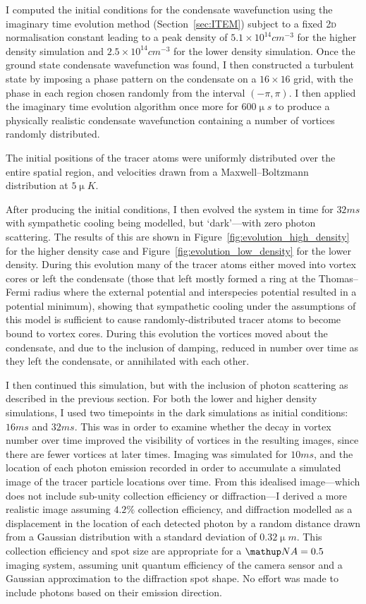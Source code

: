 I computed the initial conditions for the condensate wavefunction using the imaginary time evolution method (Section~\ref{sec:ITEM}) subject to a fixed \textsc{2d} normalisation constant leading to a peak density of $5.1\times 10^{14}\unit{cm}^{-3}$ for the higher density simulation and $2.5\times 10^{14}\unit{cm}^{-3}$ for the lower density simulation. Once the ground state condensate wavefunction was found, I then constructed a turbulent state by imposing a phase pattern on the condensate on a $16\times16$ grid, with the phase in each region chosen randomly from the interval $(-\pi, \pi)$. I then applied the imaginary time evolution algorithm once more for $600\unit{\upmu s}$ to produce a physically realistic condensate wavefunction containing a number of vortices randomly distributed.

The initial positions of the tracer atoms were uniformly distributed over the entire spatial region, and velocities drawn from a Maxwell--Boltzmann distribution at $5\unit{\upmu K}$.

After producing the initial conditions, I then evolved the system in time for $32\unit{ms}$ with sympathetic cooling being modelled, but `dark'---with zero photon scattering. The results of this are shown in Figure~\ref{fig:evolution_high_density} for the higher density case and Figure~\ref{fig:evolution_low_density} for the lower density. During this evolution many of the tracer atoms either moved into vortex cores or left the condensate (those that left mostly formed a ring at the Thomas--Fermi radius where the external potential and interspecies potential resulted in a potential minimum), showing that sympathetic cooling under the assumptions of this model is sufficient to cause randomly-distributed tracer atoms to become bound to vortex cores. During this evolution the vortices moved about the condensate, and due to the inclusion of damping, reduced in number over time as they left the condensate, or annihilated with each other.

I then continued this simulation, but with the inclusion of photon scattering as described in the previous section. For both the lower and higher density simulations, I used two timepoints in the dark simulations as initial conditions: $16\unit{ms}$ and $32\unit{ms}$. This was in order to examine whether the decay in vortex number over time improved the visibility of vortices in the resulting images, since there are fewer vortices at later times. Imaging was simulated for $10\unit{ms}$, and the location of each photon emission recorded in order to accumulate a simulated image of the tracer particle locations over time. From this idealised image---which does not include sub-unity collection efficiency or diffraction---I derived a more realistic image assuming $4.2 \%$ collection efficiency, and diffraction modelled as a displacement in the location of each detected photon by a random distance drawn from a Gaussian distribution with a standard deviation of $0.32\unit{\upmu m}$. This collection efficiency and spot size are appropriate for a $\up{NA}=0.5$ imaging system, assuming unit quantum efficiency of the camera sensor and a Gaussian approximation to the diffraction spot shape. No effort was made to include photons based on their emission direction.

